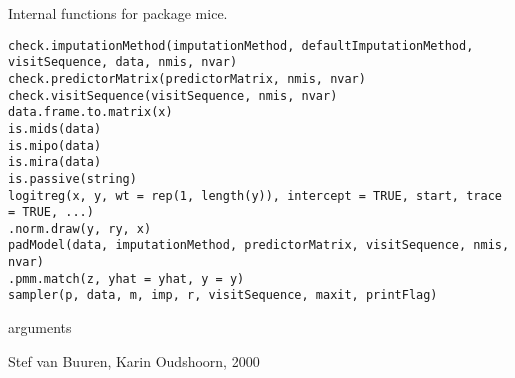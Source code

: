 \documentclass{article}
\begin{document}
\begin{Description}\relax
Internal functions for package mice.
\end{Description}
\begin{Usage}
\begin{verbatim}
check.imputationMethod(imputationMethod, defaultImputationMethod, visitSequence, data, nmis, nvar)
check.predictorMatrix(predictorMatrix, nmis, nvar)
check.visitSequence(visitSequence, nmis, nvar)
data.frame.to.matrix(x)
is.mids(data)
is.mipo(data)
is.mira(data)
is.passive(string)
logitreg(x, y, wt = rep(1, length(y)), intercept = TRUE, start, trace = TRUE, ...)
.norm.draw(y, ry, x)
padModel(data, imputationMethod, predictorMatrix, visitSequence, nmis, nvar)
.pmm.match(z, yhat = yhat, y = y)
sampler(p, data, m, imp, r, visitSequence, maxit, printFlag)
\end{verbatim}
\end{Usage}
\begin{Arguments}
\begin{ldescription}
\item[\code{imputationMethod, defaultImputationMethod, visitSequence, data, nmis, nvar,
predictorMatrix, x, y, ry, string, wt, intercept, start, trace, z, yhat, p, m,
imp, r, maxit, printFlag, ...}] arguments
\end{ldescription}
\end{Arguments}
\begin{Author}\relax
Stef van Buuren, Karin Oudshoorn, 2000
\end{Author}
\end{document}
